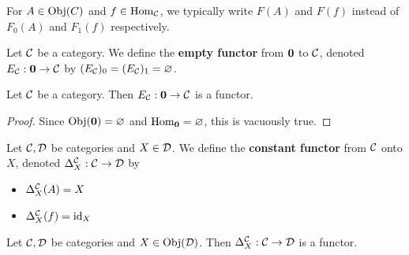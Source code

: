 \documentclass{book}
\begin{document}
	\begin{note}
		For $A \in \operatorname{Obj}(C)$ and $f \in \operatorname{Hom}_{\mathcal{C}}$, we typically write $F(A)$ and $F(f)$ instead of $F_0(A)$ and $F_1(f)$ respectively.
	\end{note}

	\begin{defn}
		Let $\mathcal{C}$ be a category. We define the \textbf{empty functor} from $\operatorname*{\mathbf{0}}$ to $\mathcal{C}$, denoted $E_{\mathcal{C}}: \operatorname*{\mathbf{0}} \rightarrow \mathcal{C}$ by $(E_{\mathcal{C}})_0 = (E_{\mathcal{C}})_1 = \varnothing$. 
	\end{defn}

	\begin{ex}
		Let $\mathcal{C}$ be a category. Then $E_{\mathcal{C}}: \operatorname*{\mathbf{0}} \rightarrow \mathcal{C}$ is a functor.
	\end{ex}

	\begin{proof}
		Since $\operatorname{Obj}(\operatorname*{\mathbf{0}}) = \varnothing$ and $\operatorname{Hom}_{\operatorname*{\mathbf{0}}} = \varnothing$, this is vacuously true. 
	\end{proof}

	\begin{defn}
		Let $\mathcal{C}, \mathcal{D}$ be categories and $X \in \mathcal{D}$. We define the \textbf{constant functor} from $\mathcal{C}$ onto $X$, denoted $\Delta^{\mathcal{C}}_X: \mathcal{C} \rightarrow \mathcal{D}$ by 
		\begin{itemize}
			\item $\Delta^{\mathcal{C}}_X (A) = X$
			\item $\Delta^{\mathcal{C}}_X (f) = \operatorname{id}_X$
		\end{itemize}
	\end{defn}
	
	\begin{ex}
		Let $\mathcal{C}, \mathcal{D}$ be categories and $X \in \operatorname{Obj}(\mathcal{D})$. Then $\Delta^{\mathcal{C}}_X : \mathcal{C} \rightarrow \mathcal{D}$ is a functor.
	\end{ex}
\end{document}
